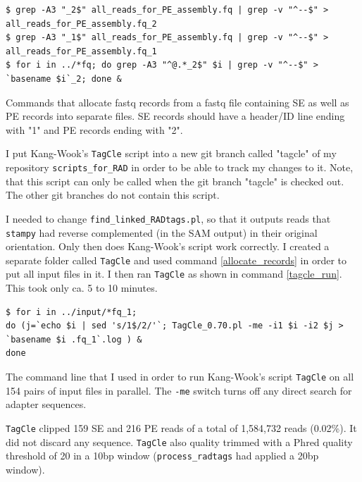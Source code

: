 \documentclass{article}\usepackage[]{graphicx}\usepackage[]{color}
\begin{document}
\begin{command}
\captionsetup{type=command} %
\begin{Verbatim}[fontsize=\footnotesize]
$ grep -A3 "_2$" all_reads_for_PE_assembly.fq | grep -v "^--$" > all_reads_for_PE_assembly.fq_2
$ grep -A3 "_1$" all_reads_for_PE_assembly.fq | grep -v "^--$" > all_reads_for_PE_assembly.fq_1
$ for i in ../*fq; do grep -A3 "^@.*_2$" $i | grep -v "^--$" > `basename $i`_2; done &
\end{Verbatim}
\caption{Commands that allocate fastq records from a fastq file containing SE as well as PE records into separate files. SE records should have a header/ID line ending with "1" and PE records ending with "2".}
\label{allocate_records}
\end{command}

I put Kang-Wook's \texttt{TagCle} script into a new git branch called "tagcle" of my repository \texttt{scripts\_for\_RAD} in order to be able to track my changes to it. Note, that this script can only be called when the git branch "tagcle" is checked out. The other git branches do not contain this script.

I needed to change \texttt{find\_linked\_RADtags.pl}, so that it outputs reads that \texttt{stampy} had reverse complemented (in the SAM output) in their original orientation. Only then does Kang-Wook's script work correctly. I created a separate folder called \texttt{TagCle} and used command \ref{allocate_records} in order to put all input files in it.
I then ran \texttt{TagCle} as shown in command \ref{tagcle_run}. This took only ca. 5 to 10 minutes. 

\begin{command}[htb]
\captionsetup{type=command} %
\begin{Verbatim}[fontsize=\footnotesize]
$ for i in ../input/*fq_1; 
do (j=`echo $i | sed 's/1$/2/'`; TagCle_0.70.pl -me -i1 $i -i2 $j > `basename $i .fq_1`.log ) & 
done
\end{Verbatim}
\caption{The command line that I used in order to run Kang-Wook's script \texttt{TagCle} on all 154 pairs of input files in parallel. The \texttt{-me} switch turns off any direct search for adapter sequences.}
\label{tagcle_run}
\end{command}

\texttt{TagCle} clipped 159 SE and 216 PE reads of a total of 1,584,732 reads (0.02\%). It did not discard any sequence. \texttt{TagCle} also quality trimmed with a Phred quality threshold of 20 in a 10bp window (\texttt{process\_radtags} had applied a 20bp window).
\end{document}
